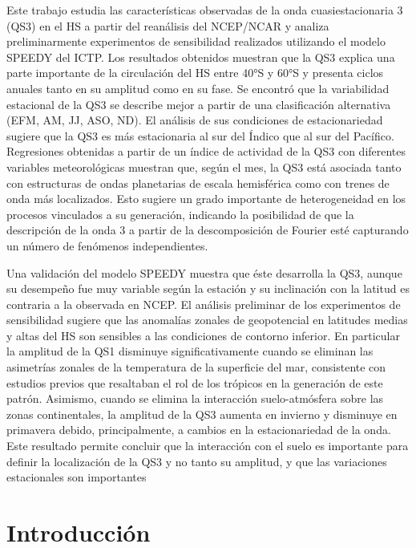 \documentclass[spanish,a4paper,12pt,oneside]{book}
\begin{document}
Este trabajo estudia las características observadas de la onda
cuasiestacionaria 3 (QS3) en el HS a partir del reanálisis del NCEP/NCAR
y analiza preliminarmente experimentos de sensibilidad realizados
utilizando el modelo SPEEDY del ICTP. Los resultados obtenidos muestran
que la QS3 explica una parte importante de la circulación del HS entre
40°S y 60°S y presenta ciclos anuales tanto en su amplitud como en su
fase. Se encontró que la variabilidad estacional de la QS3 se describe
mejor a partir de una clasificación alternativa (EFM, AM, JJ, ASO, ND).
El análisis de sus condiciones de estacionariedad sugiere que la QS3 es
más estacionaria al sur del Índico que al sur del Pacífico. Regresiones
obtenidas a partir de un índice de actividad de la QS3 con diferentes
variables meteorológicas muestran que, según el mes, la QS3 está
asociada tanto con estructuras de ondas planetarias de escala
hemisférica como con trenes de onda más localizados. Esto sugiere un
grado importante de heterogeneidad en los procesos vinculados a su
generación, indicando la posibilidad de que la descripción de la onda 3
a partir de la descomposición de Fourier esté capturando un número de
fenómenos independientes.

Una validación del modelo SPEEDY muestra que éste desarrolla la QS3,
aunque su desempeño fue muy variable según la estación y su inclinación
con la latitud es contraria a la observada en NCEP. El análisis
preliminar de los experimentos de sensibilidad sugiere que las anomalías
zonales de geopotencial en latitudes medias y altas del HS son sensibles
a las condiciones de contorno inferior. En particular la amplitud de la
QS1 disminuye significativamente cuando se eliminan las asimetrías
zonales de la temperatura de la superficie del mar, consistente con
estudios previos que resaltaban el rol de los trópicos en la generación
de este patrón. Asimismo, cuando se elimina la interacción
suelo-atmósfera sobre las zonas continentales, la amplitud de la QS3
aumenta en invierno y disminuye en primavera debido, principalmente, a
cambios en la estacionariedad de la onda. Este resultado permite
concluir que la interacción con el suelo es importante para definir la
localización de la QS3 y no tanto su amplitud, y que las variaciones
estacionales son importantes

\restoregeometry
\setcounter{tocdepth}{3}
\tableofcontents

\listoffigures
\newpage

\mainmatter

\hypertarget{introduccion}{%
\chapter{Introducción}\label{introduccion}}
\end{document}
